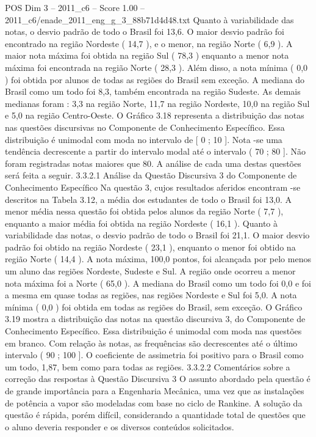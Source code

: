 \begin{textsample}{POS Dim 3 – 2011\_c6 – Score 1.00 – 2011\_c6/enade\_2011\_eng\_g\_3\_88b71d4d48.txt}
Quanto à variabilidade das notas, o desvio padrão de todo o Brasil foi 13,6.
O maior desvio padrão foi encontrado na região Nordeste ( 14,7 ), e o menor, na região Norte ( 6,9 ).
A maior nota máxima foi obtida na região Sul ( 78,3 ) enquanto a menor nota máxima foi encontrada na região Norte ( 28,3 ).
Além disso, a nota mínima ( 0,0 ) foi obtida por alunos de todas as regiões do Brasil sem exceção.
A mediana do Brasil como um todo foi 8,3, também encontrada na região Sudeste.
As demais medianas foram : 3,3 na região Norte, 11,7 na região Nordeste, 10,0 na região Sul e 5,0 na região Centro-Oeste.
O Gráfico 3.18 representa a distribuição das notas nas questões discursivas no Componente de Conhecimento Específico.
Essa distribuição é unimodal com moda no intervalo de [ 0 ; 10 ].
Nota -se uma tendência decrescente a partir do intervalo modal até o intervalo ( 70 ; 80 ].
Não foram registradas notas maiores que 80.
A análise de cada uma destas questões será feita a seguir. 3.3.2.1 Análise da Questão Discursiva 3 do Componente de Conhecimento Específico Na questão 3, cujos resultados aferidos encontram -se descritos na Tabela 3.12, a média dos estudantes de todo o Brasil foi 13,0.
A menor média nessa questão foi obtida pelos alunos da região Norte ( 7,7 ), enquanto a maior média foi obtida na região Nordeste ( 16,1 ).
Quanto à variabilidade das notas, o desvio padrão de todo o Brasil foi 21,1.
O maior desvio padrão foi obtido na região Nordeste ( 23,1 ), enquanto o menor foi obtido na região Norte ( 14,4 ).
A nota máxima, 100,0 pontos, foi alcançada por pelo menos um aluno das regiões Nordeste, Sudeste e Sul.
A região onde ocorreu a menor nota máxima foi a Norte ( 65,0 ).
A mediana do Brasil como um todo foi 0,0 e foi a mesma em quase todas as regiões, nas regiões Nordeste e Sul foi 5,0.
A nota mínima ( 0,0 ) foi obtida em todas as regiões do Brasil, sem exceção.
O Gráfico 3.19 mostra a distribuição das notas na questão discursiva 3, do Componente de Conhecimento Específico.
Essa distribuição é unimodal com moda nas questões em branco.
Com relação às notas, as frequências são decrescentes até o último intervalo ( 90 ; 100 ].
O coeficiente de assimetria foi positivo para o Brasil como um todo, 1,87, bem como para todas as regiões. 3.3.2.2 Comentários sobre a correção das respostas à Questão Discursiva 3 O assunto abordado pela questão é de grande importância para a Engenharia Mecânica, uma vez que as instalações de potência a vapor são modeladas com base no ciclo de Rankine.
A solução da questão é rápida, porém difícil, considerando a quantidade total de questões que o aluno deveria responder e os diversos conteúdos solicitados.

\end{textsample}
